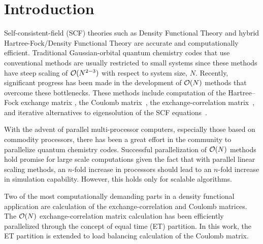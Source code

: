\commentoutA{\documentclass[prl,aps,twocolumn,twocolumngrid,superbib]{revtex4}}
\begin{document}

\section{Introduction}
\label{sec:intro}
Self-consistent-field (SCF) theories such as Density Functional Theory
and hybrid Hartree-Fock/Density Functional Theory are accurate and
computationally efficient. Traditional Gaussian-orbital quantum
chemistry codes that use conventional methods\cite{ASzabo89} are
usually restricted to small systems since these methods have steep
scaling of ${\cal O}(N^{2-3})$ with respect to system size, $N$.
Recently, significant progress has been made in the development of
${\cal O}(N)$ methods that overcome these bottlenecks.  These methods
include computation of the Hartree--Fock exchange matrix
\cite{ESchwegler96,ESchwegler97,ESchwegler98A,ESchwegler99,ESchwegler00,CTymczak04b},
the Coulomb
matrix~\cite{CWhite94B,CWhite96A,MChallacombe96,MChallacombe96B,MStrain96,JPerezjorda97,MChallacombe97,CTymczak04a},
the exchange-correlation
matrix~\cite{CTymczak04a,Jorda95,RStratmann96,CGuerra98,MChallacombe00A},
and iterative alternatives to eigensolution of the SCF
equations~\cite{XLi93,MDaw93,ADaniels97,APalser98,MChallacombe99,ANiklasson02A,ANiklasson03}.

With the advent of parallel multi-processor computers, especially
those based on commodity processors, there has been a great effort in
the community to parallelize quantum chemistry
codes\cite{MSchmidt93,MColvin93,Harrison_94v45,Guerra_95,TFurlani95,Sosa_98v19,vonArnim98,Furlani_00v128,Sosa_00v26,RKendall00,GFletcher00,Baker_02v23,JBaker04}.
Successful parallelization of ${\cal O}(N)$ methods hold promise for
large scale computations given the fact that with parallel linear
scaling methods, an $n$-fold increase in processors should lead to an
$n$-fold increase in simulation capability. However, this holds only
for scalable algorithms.

Two of the most computationally demanding parts in a density
functional application are calculation of the exchange-correlation and
Coulomb matrices. The ${\cal O}(N)$ exchange-correlation matrix
calculation has been efficiently parallelized through the concept of
equal time (ET) partition\cite{CGan03}.  In this work, the ET
partition is extended to load balancing calculation of the Coulomb
matrix.
\end{document}
